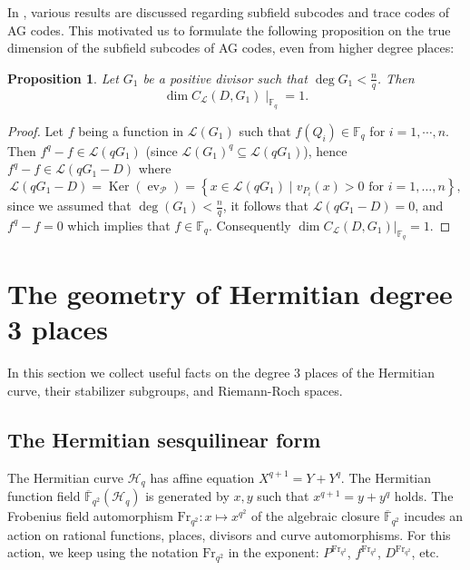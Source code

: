 \documentclass[11pt]{amsart}
\theoremstyle{plain}
\newtheorem{proposition}[theorem]{Proposition}
\theoremstyle{definition}
\theoremstyle{remark}
\newcommand{\Frob}{{\mathrm{Fr}_{q^2}}}
\newcommand{\calP}{\mathcal{P}}
\begin{document}
In \cite[Chapter~9]{stichtenoth2009algebraic}, various results are discussed regarding subfield subcodes and trace codes of AG codes. This motivated us to formulate the following proposition on the true dimension of the subfield subcodes of AG codes, even from higher degree places:

\begin{proposition}\label{prop:sub}
	Let $G_1$ be a positive divisor such that $\deg G_1 < \frac{n}{q}$. Then 
	\[
	\dim C_{\mathcal{L}}(D,G_1) \mid_{\mathbb{F}_q} = 1.
	\]
\end{proposition}


\begin{proof}
	Let $f$ being a function in $\mathscr{L}(G_1)$ such that $f(Q_i) \in \mathbb{F}_q$ for $i=1,\cdots,n$. Then $f^q -f \in \mathscr{L}(qG_1)$ (since $\mathscr{L}(G_1)^q \subseteq \mathscr{L}(qG_1)$), hence $f^q - f \in  \mathscr{L}(qG_1-D)$ where
	\[\mathscr{L}(qG_1-D) = \operatorname{Ker}\left(\operatorname{ev}_{\calP}\right)=\left\{x \in \mathscr{L}(qG_1) \mid v_{P_i}(x)>0 \text { for } i=1, \ldots, n\right\} ,\]
	since we assumed that $\deg (G_1)<\frac{n}{q}$, it follows that $\mathscr{L}(qG_1 - D)=0$, and  $f^q -f =0$ which implies that $f \in \mathbb{F}_q$. Consequently $\dim C_{\mathcal{L}}(D,G_1)|_{ \mathbb{F}_q}= 1$.
\end{proof}






\section{The geometry of Hermitian degree 3 places} \label{sec:geometry}

In this section we collect useful facts on the degree 3 places of the Hermitian curve, their stabilizer subgroups, and Riemann-Roch spaces. 

\subsection{The Hermitian sesquilinear form} \label{ssec:h-form}
The Hermitian curve $\mathscr{H}_q$ has affine equation $X^{q+1}=Y+Y^q$. The Hermitian function field $\overline{\mathbb{F}}_{q^2}(\mathscr{H}_q)$ is generated by $x,y$ such that $x^{q+1}=y+y^q$ holds. The Frobenius field automorphism $\Frob:x\mapsto x^{q^2}$ of the algebraic closure $\overline{\mathbb{F}}_{q^2}$ incudes an action on rational functions, places, divisors and curve automorphisms. For this action, we keep using the notation $\Frob$ in the exponent: $P^\Frob$, $f^\Frob$, $D^\Frob$, etc. 
\end{document}
